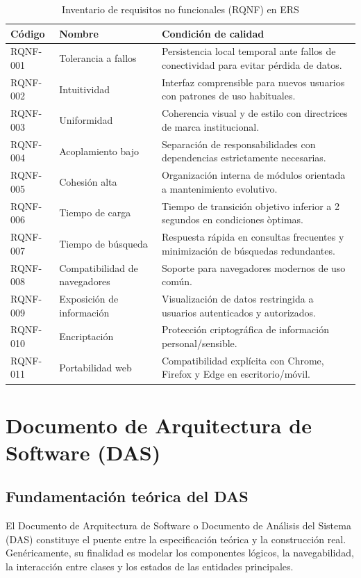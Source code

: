 \begin{table}[!htbp]
\centering
\small
\begin{tabular}{|P{1.6cm}|P{3.2cm}|P{6.9cm}|}
\hline
\textbf{C\'odigo} & \textbf{Nombre} & \textbf{Condici\'on de calidad} \\
\hline
RQNF-001 & Tolerancia a fallos & Persistencia local temporal ante fallos de conectividad para evitar p\'erdida de datos. \\
\hline
RQNF-002 & Intuitividad & Interfaz comprensible para nuevos usuarios con patrones de uso habituales. \\
\hline
RQNF-003 & Uniformidad & Coherencia visual y de estilo con directrices de marca institucional. \\
\hline
RQNF-004 & Acoplamiento bajo & Separaci\'on de responsabilidades con dependencias estrictamente necesarias. \\
\hline
RQNF-005 & Cohesi\'on alta & Organizaci\'on interna de m\'odulos orientada a mantenimiento evolutivo. \\
\hline
RQNF-006 & Tiempo de carga & Tiempo de transici\'on objetivo inferior a 2 segundos en condiciones \`optimas. \\
\hline
RQNF-007 & Tiempo de b\'usqueda & Respuesta r\'apida en consultas frecuentes y minimizaci\'on de b\'usquedas redundantes. \\
\hline
RQNF-008 & Compatibilidad de navegadores & Soporte para navegadores modernos de uso com\'un. \\
\hline
RQNF-009 & Exposici\'on de informaci\'on & Visualizaci\'on de datos restringida a usuarios autenticados y autorizados. \\
\hline
RQNF-010 & Encriptaci\'on & Protecci\'on criptogr\'afica de informaci\'on personal/sensible. \\
\hline
RQNF-011 & Portabilidad web & Compatibilidad expl\'icita con Chrome, Firefox y Edge en escritorio/m\'ovil. \\
\hline
\end{tabular}
\normalsize
\caption{Inventario de requisitos no funcionales (RQNF) en ERS}
\label{tab:rqnf-inventario-completo}
\end{table}


\FloatBarrier
\section{Documento de Arquitectura de Software (DAS)}

\subsection{Fundamentaci\'on te\'orica del DAS}
El Documento de Arquitectura de Software o Documento de An\'alisis del Sistema (DAS) constituye el puente entre la especificaci\'on te\'orica y la construcci\'on real. Gen\'ericamente, su finalidad es modelar los componentes l\'ogicos, la navegabilidad, la interacci\'on entre clases y los estados de las entidades principales.


